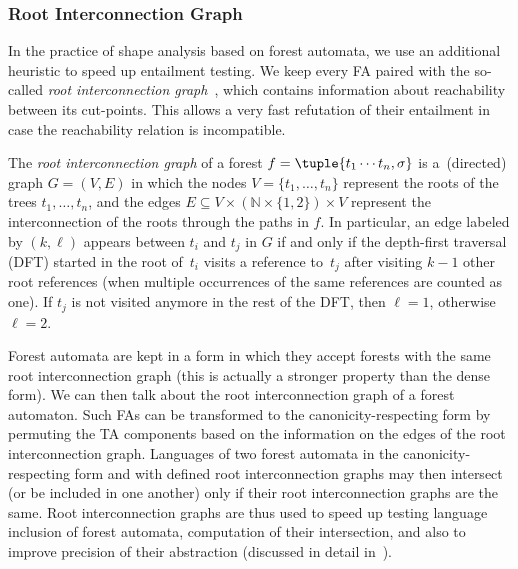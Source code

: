 \subsubsection*{Root Interconnection Graph}
\label{sec:icgraph}

In the practice of shape analysis based on forest automata, we use an
additional heuristic to speed up entailment testing.
We keep every FA paired with the so-called \emph{root interconnection
graph}~\cite{jiri:diza}, which contains information about reachability between
its cut-points.
This allows a very fast refutation of their entailment in case the reachability
relation is incompatible. 

The \emph{root interconnection graph} of a forest $f = \tuple{t_1\cdots t_n,\sigma}$
 is a~(directed) graph $G = (V,E)$ in which the nodes $V=\{t_1,\dots,t_n\}$
represent the roots of the trees $t_1,\ldots,t_n$, and the edges $E \subseteq V \times (\mathbb{N} \times \{1,2\}) \times V$
represent the interconnection of the roots through the paths in $f$.
%
In particular, an edge labeled by $(k,\ell)$ appears between $t_i$ and $t_j$ in $G$
if and only if the depth-first traversal (DFT) started in the root of~$t_i$
visits a reference to~$t_j$
after visiting $k-1$ other root references (when multiple occurrences
of the same references are counted as one). If $t_j$ is not visited anymore in the rest of
the DFT, then $\ell = 1$, otherwise $\ell = 2$.

Forest automata are kept in a form in which they accept forests with the same
root interconnection graph (this is actually a stronger property than the
dense form). 
We can then talk about the root interconnection graph of a forest automaton.
Such FAs can be transformed to the canonicity-respecting form by permuting
the TA components based on the information on the edges of the root
interconnection graph.
Languages of two forest automata in the canonicity-respecting form and with
defined root interconnection graphs may then intersect (or be included in one
another) only if their root interconnection graphs are the same.
%
Root interconnection graphs are thus used to speed up testing language
inclusion of forest automata, computation of their intersection, and also to
improve precision of their abstraction (discussed in detail
in~\cite{jiri:diza}).





